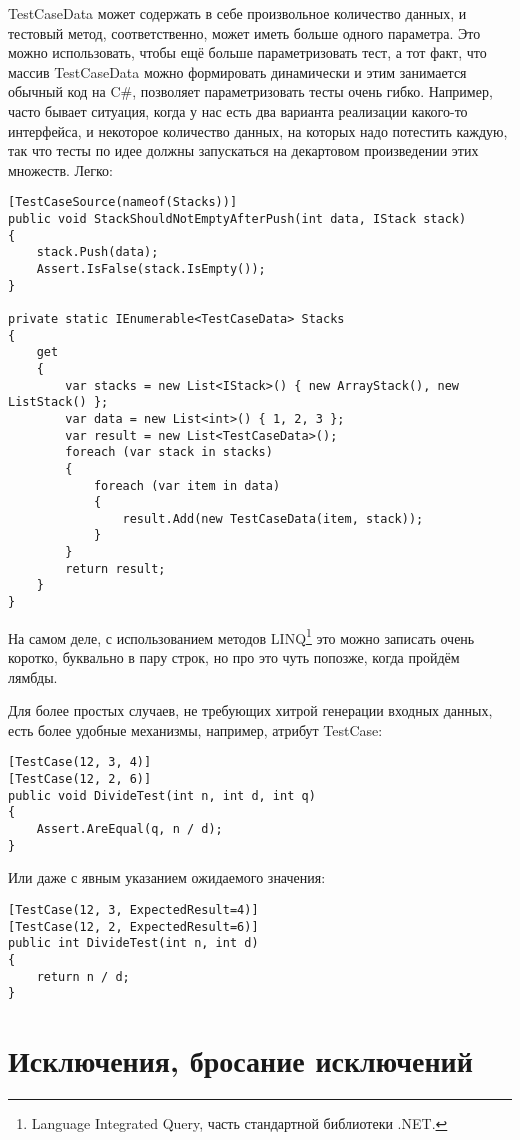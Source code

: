 \documentclass{../../text-style}
\begin{document}
TestCaseData может содержать в себе произвольное количество данных, и тестовый метод, соответственно, может иметь больше одного параметра. Это можно использовать, чтобы ещё больше параметризовать тест, а тот факт, что массив TestCaseData можно формировать динамически и этим занимается обычный код на C\#, позволяет параметризовать тесты очень гибко. Например, часто бывает ситуация, когда у нас есть два варианта реализации какого-то интерфейса, и некоторое количество данных, на которых надо потестить каждую, так что тесты по идее должны запускаться на декартовом произведении этих множеств. Легко:

\begin{verbatim}
[TestCaseSource(nameof(Stacks))]
public void StackShouldNotEmptyAfterPush(int data, IStack stack)
{
    stack.Push(data);
    Assert.IsFalse(stack.IsEmpty());
}

private static IEnumerable<TestCaseData> Stacks 
{
    get
    {
        var stacks = new List<IStack>() { new ArrayStack(), new ListStack() };
        var data = new List<int>() { 1, 2, 3 };
        var result = new List<TestCaseData>();
        foreach (var stack in stacks)
        {
            foreach (var item in data)
            {
                result.Add(new TestCaseData(item, stack));
            }
        }
        return result;
    }
}
\end{verbatim}

На самом деле, с использованием методов LINQ\footnote{Language Integrated Query, часть стандартной библиотеки .NET.} это можно записать очень коротко, буквально в пару строк, но про это чуть попозже, когда пройдём лямбды.

Для более простых случаев, не требующих хитрой генерации входных данных, есть более удобные механизмы, например, атрибут TestCase:

\begin{verbatim}
[TestCase(12, 3, 4)]
[TestCase(12, 2, 6)]
public void DivideTest(int n, int d, int q)
{
    Assert.AreEqual(q, n / d);
}
\end{verbatim}

Или даже с явным указанием ожидаемого значения:

\begin{verbatim}
[TestCase(12, 3, ExpectedResult=4)]
[TestCase(12, 2, ExpectedResult=6)]
public int DivideTest(int n, int d)
{
    return n / d;
}
\end{verbatim}

\section{Исключения, бросание исключений}
\end{document}
